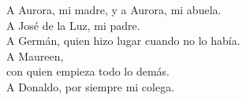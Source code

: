 \thispagestyle{empty}
\vspace*{0.22\textheight}
\begin{flushright}
\itshape
\begin{minipage}{0.70\textwidth}
\raggedleft

A Aurora, mi madre, y a Aurora, mi abuela.\\[1.2cm]

A José de la Luz, mi padre.\\[1.2cm]

A Germán, quien hizo lugar cuando no lo había.\\[1.2cm]

A Maureen,\\
con quien empieza todo lo demás.\\[1.2cm]

A Donaldo, por siempre mi colega.
\end{minipage}
\end{flushright}
\cleardoublepage
